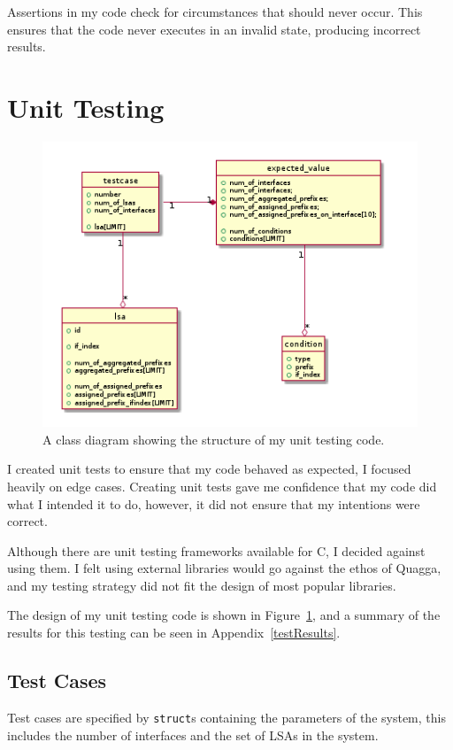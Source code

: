Assertions in my code check for circumstances that should never occur. This
ensures that the code never executes in an invalid state, producing incorrect
results. 

\section{Unit Testing}
\begin{figure}
\begin{center}
	\includegraphics[width=\linewidth]{../Diagrams/Testing/testcase.png}
	\caption{A class diagram showing the structure of my unit testing code.}
	\label{fig:testcase}
\end{center}
\end{figure}
I created unit tests to ensure that my code behaved as expected, I focused
heavily on edge cases. Creating unit tests gave me confidence that my code did
what I intended it to do, however, it did not ensure that my intentions were
correct.

Although there are unit testing frameworks available for C, I decided against
using them.  I felt using external libraries  would go against the ethos of
Quagga, and my testing strategy did not fit the design of most popular
libraries. 

The design of my unit testing code is shown in Figure~\ref{fig:testcase}, and a
summary of the results for this testing can be seen in
Appendix~\ref{testResults}.

\subsection{Test Cases}
Test cases are specified by \texttt{struct}s containing the parameters of the
system, this includes the number of interfaces and the set of LSAs in the
system. 

